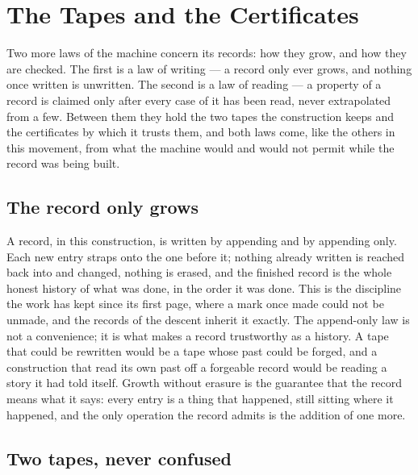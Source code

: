 \chapter{The Tapes and the Certificates}
\label{chap:tapes-and-certificates}

Two more laws of the machine concern its records: how they grow, and how they are checked. The first is a
law of writing --- a record only ever grows, and nothing once written is unwritten. The second is a law of
reading --- a property of a record is claimed only after every case of it has been read, never extrapolated
from a few. Between them they hold the two tapes the construction keeps and the certificates by which it
trusts them, and both laws come, like the others in this movement, from what the machine would and would not
permit while the record was being built.

\section{The record only grows}
\label{se:the-record-only-grows}

A record, in this construction, is written by appending and by appending only. Each new entry straps onto
the one before it; nothing already written is reached back into and changed, nothing is erased, and the
finished record is the whole honest history of what was done, in the order it was done. This is the
discipline the work has kept since its first page, where a mark once made could not be unmade, and the
records of the descent inherit it exactly. The append-only law is not a convenience; it is what makes a
record trustworthy as a history. A tape that could be rewritten would be a tape whose past could be forged,
and a construction that read its own past off a forgeable record would be reading a story it had told
itself. Growth without erasure is the guarantee that the record means what it says: every entry is a thing
that happened, still sitting where it happened, and the only operation the record admits is the addition of
one more.

\section{Two tapes, never confused}
\label{se:two-tapes-never-confused}

